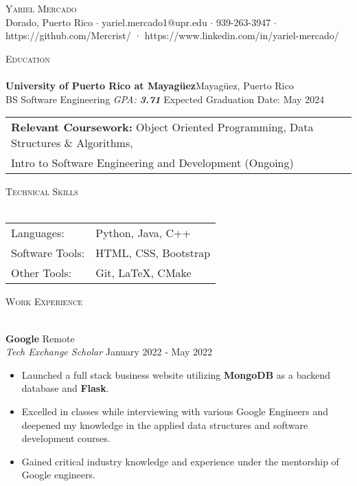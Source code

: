 \documentclass[a4paper]{article}
\newcommand{\lineunder} {
    \vspace*{-8pt} \\
    \hspace*{-18pt} \hrulefill \\
}
\newcommand{\header} [1] {
    {\hspace*{-18pt}\vspace*{6pt} \textsc{#1}}
    \vspace*{-6pt} \lineunder
}
\begin{document}
\vspace*{-40pt}

    

\vspace*{-10pt}
\begin{center}
	{\Huge \scshape {Yariel Mercado}}\\
	Dorado, Puerto Rico $\cdot$ yariel.mercado1@upr.edu $\cdot$ 939-263-3947 $\cdot$ https://github.com/Mercrist/ · https://www.linkedin.com/in/yariel-mercado/\\
\end{center}

\header{Education}
\textbf{University of Puerto Rico at Mayagüez}\hfill Mayagüez, Puerto Rico\\
BS Software Engineering \textit{GPA: \bf{3.71}} \hfill Expected Graduation Date: May 2024\\

\vspace{2mm}
\begin{tabular}{ l l }
	\textbf{Relevant Coursework:} Object Oriented 	                    				Programming, Data Structures \& Algorithms, \\ Intro to Software Engineering and Development (Ongoing) 
\vspace{2mm}
\end{tabular}

\header{Technical Skills}
\begin{tabular}{ l l }
	Languages:       & Python, Java, C++                \\
	Software Tools: & HTML, CSS, Bootstrap \\
	Other Tools:   & Git, LaTeX, CMake  \\
	
\end{tabular}
\vspace{2mm}

\header{Work Experience}
\vspace{-1mm}

\textbf{Google} \hfill Remote\\
\textit{Tech Exchange Scholar} \hfill January 2022 - May 2022\\
\vspace{-2mm}
\begin{itemize} \itemsep -1pt
	\item Launched a full stack business website utilizing \textbf{MongoDB} as a backend database and \textbf{Flask}.
	\item Excelled in classes while interviewing with various Google Engineers and deepened my knowledge in the applied data structures and software development courses.
	\item Gained critical industry knowledge and experience under the mentorship of Google engineers. 
\end{itemize}
\end{document}
